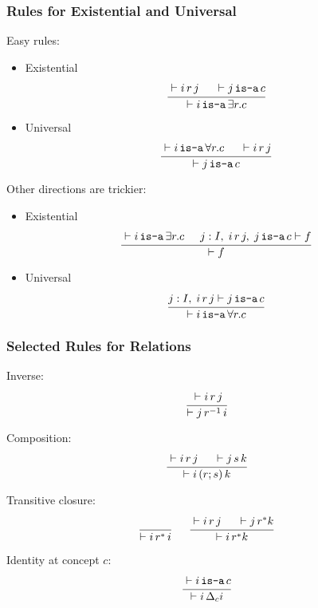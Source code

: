 \begin{frame}\frametitle{Rules for Existential and Universal}
Easy rules:
\begin{itemize}
\item Existential
\[\cfrac{\vdash i\,r\,j \hspace*{.5cm} \vdash j\mathop{\texttt{is-a}} c}{\vdash i \mathop{\texttt{is-a}} \exists r.c }\,\]
\item Universal
\[\cfrac{\vdash i \mathop{\texttt{is-a}} \forall r.c \hspace*{.5cm} \vdash i\,r\,j}{\vdash j\mathop{\texttt{is-a}} c}\,\]
\end{itemize}

Other directions are trickier:

\begin{itemize}
\item Existential
\[\cfrac{\vdash i \mathop{\texttt{is-a}} \exists r.c \hspace*{.5cm} j:I,\;i\,r\,j,\;j\mathop{\texttt{is-a}} c\vdash f}{\vdash f}\,\]
\item Universal
\[\cfrac{j:I,\; i\,r\,j\vdash j\mathop{\texttt{is-a}} c}{\vdash i\mathop{\texttt{is-a}}\forall r.c}\,\]
\end{itemize}
\end{frame}

\begin{frame}\frametitle{Selected Rules for Relations}
Inverse:
\[\cfrac{\vdash i \,r\,j}{\vdash j\,r^{-1}\,i}\,\]

Composition:
\[\cfrac{\vdash i \,r\,j \hspace*{.5cm} \vdash j\,s\,k}{\vdash i\,(r;s)\,k}\,\]

Transitive closure:
\[\cfrac{}{\vdash i \,r^*\,i}\, \hspace*{.5cm} \cfrac{\vdash i\,r\,j \hspace*{.5cm} \vdash j\,r^* k}{\vdash i\,r^* k}\,\]

Identity at concept $c$:
\[\cfrac{\vdash i \mathop{\texttt{is-a}} c}{\vdash i\,\Delta_c i}\,\]
\end{frame}

%


